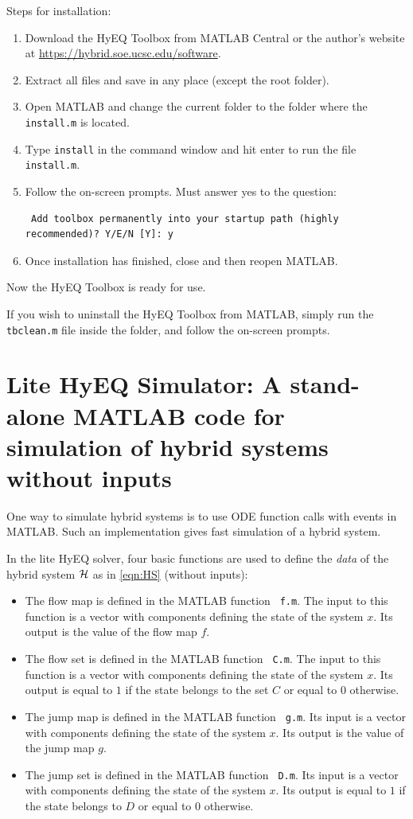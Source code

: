 \documentclass{article}
\newcommand{\HyEQfolder}{\mbox{{\ttfamily{ HyEQ\_Toolbox\_V2\_04\ }}}}
\begin{document}
Steps for installation:

\begin{enumerate}
\item Download the HyEQ Toolbox from MATLAB Central or the author's website at \url{https://hybrid.soe.ucsc.edu/software}.
\item Extract all files and save in any place (except the root folder).
\item Open MATLAB and change the current folder to the folder where the {\tt install.m} is located.
\item Type {\tt install} in the command window and hit enter to run the file {\tt install.m}.
\item Follow the on-screen prompts. Must answer yes to the question: \begin{verbatim} Add toolbox permanently into your startup path (highly recommended)? Y/E/N [Y]: y \end{verbatim}
\item Once installation has finished, close and then reopen MATLAB.
\end{enumerate}

Now the HyEQ Toolbox is ready for use.

If you wish to uninstall the HyEQ Toolbox from MATLAB, simply run the {\tt tbclean.m} file inside the \HyEQfolder folder, and follow the on-screen prompts.

\section{
Lite HyEQ Simulator: A stand-alone MATLAB code for simulation of  hybrid systems without inputs}
\label{sec:litesolver}
One way to simulate hybrid systems is to use ODE function calls with events in MATLAB. 
Such an implementation gives fast simulation of a hybrid system.

In the lite HyEQ solver, four basic functions are used to define the {\em data} of the hybrid system $\mathcal{H}$
as in \eqref{eqn:HS} (without inputs):
\begin{itemize}
\item The flow map is defined in the MATLAB function {\tt
f.m}. The input to this function is a vector with components defining the state of the system $x$. Its output is the value of the flow map $f$.
\item The flow set is defined in the MATLAB function {\tt
C.m}. The input to this function is a vector with components defining the state of the system $x$. Its output is equal to $1$ if the state belongs to the set $C$ or equal to $0$ otherwise.
\item The jump map is defined in the MATLAB function {\tt
g.m}. Its input is a vector with components defining the state of the system $x$. Its output is the value of the jump map $g$.
\item The jump set is defined in the MATLAB function {\tt
D.m}. Its input is a vector with components defining the state of the system $x$. Its output is equal to $1$ if the state belongs to $D$ or equal to $0$ otherwise.
\end{itemize}
\end{document}
